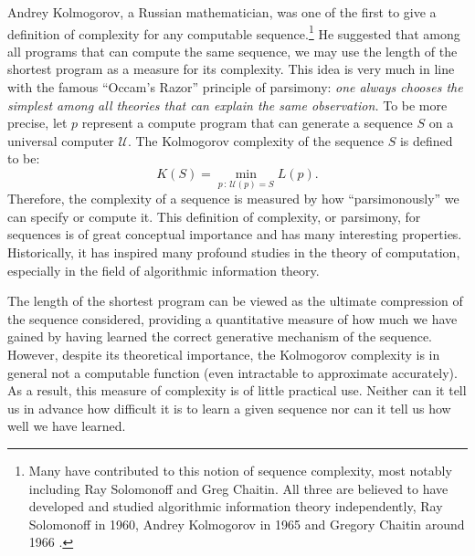 \documentclass[../../book-main.tex]{subfiles}
\begin{document}
Andrey Kolmogorov, a Russian mathematician, was one of the first to give a definition of complexity for any computable sequence.\footnote{Many have contributed to this notion of sequence complexity, most notably including Ray Solomonoff and Greg Chaitin. All three are believed to have developed and studied algorithmic information theory independently, Ray Solomonoff in 1960, Andrey Kolmogorov in 1965 \cite{Kolmogorov1998OnTO} and Gregory Chaitin around 1966 \cite{Chaitin-1966}.} He suggested that among all programs that can compute the same sequence, we may use the length of the shortest program as a measure for its complexity. This idea is very much in line with the famous ``Occam's Razor'' principle of parsimony: {\em one always chooses the simplest among all theories that can explain the same observation.} To be more precise, let $p$ represent a compute program that can generate a sequence $S$ on a universal computer $\mathcal{U}$. The  Kolmogorov complexity of the sequence $S$ is defined to be:
\begin{equation}
    K(S) = \min_{p\,:\, \mathcal{U}(p) = S} L(p). 
\end{equation}
Therefore, the complexity of a sequence is measured by how ``parsimonously'' we can specify or compute it. This definition of complexity, or parsimony, for sequences is of great conceptual importance and has many interesting properties. Historically, it has inspired many profound studies in the theory of computation, especially in the field of algorithmic information theory.

The length of the shortest program can be viewed as the ultimate compression of the sequence considered, providing a quantitative measure of how much we have gained by having learned the correct generative mechanism of the sequence. However, despite its theoretical importance, the Kolmogorov complexity is in general not a computable function \cite{Cover-Thomas} (even  intractable to approximate accurately). As a result, this measure of complexity is of little practical use. Neither can it tell us in advance how difficult it is to learn a given sequence nor can it tell us how well we have learned.





\end{document}
